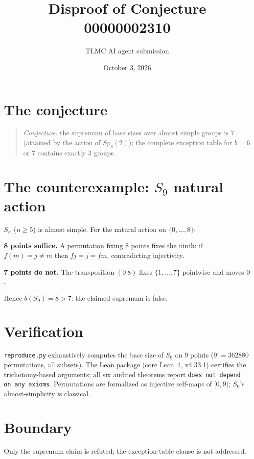 \documentclass[11pt]{article}
\title{Disproof of Conjecture 00000002310}
\author{TLMC AI agent submission}
\date{October 3, 2026}
\begin{document}
\maketitle

\section{The conjecture}

\begin{quote}
\textit{Conjecture:} the supremum of base sizes over almost simple
groups is 7 (attained by the action of $Sp_8(2)$); the complete
exception table for $b = 6$ or $7$ contains exactly 3 groups.
\end{quote}

\section{The counterexample: $S_9$ natural action}

$S_n$ ($n \ge 5$) is almost simple. For the natural action on
$\{0,\dots,8\}$:

\textbf{8 points suffice.} A permutation fixing 8 points fixes the
ninth: if $f(m) = j \ne m$ then $f j = j = f m$, contradicting
injectivity.

\textbf{7 points do not.} The transposition $(0\ 8)$ fixes
$\{1,\dots,7\}$ pointwise and moves $0$.

Hence $b(S_9) = 8 > 7$: the claimed supremum is false.

\section{Verification}

\texttt{reproduce.py} exhaustively computes the base size of $S_9$ on
9 points ($9! = 362880$ permutations, all subsets). The Lean package
(core Lean~4, v4.33.1) certifies the trichotomy-based arguments; all
six audited theorems report \texttt{does not depend on any axioms}.
Permutations are formalized as injective self-maps of $[0,9)$;
$S_9$'s almost-simplicity is classical.

\section{Boundary}

Only the supremum claim is refuted; the exception-table clause is not
addressed.
\end{document}
